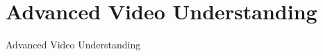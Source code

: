 \section{Advanced Video Understanding}
\begin{frame}{}
    \LARGE Advanced Video Understanding
\end{frame}








